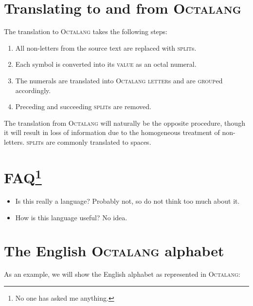 \documentclass{article}
\newcommand{\octalang}[0]{\textsc{Octalang}}
\newcommand{\tvalue}[0]{\textsc{value}}
\newcommand{\tletter}[0]{\textsc{letter}}
\newcommand{\tgroup}[0]{\textsc{group}}
\newcommand{\tsplit}[0]{\textsc{split}}
\begin{document}
\section*{Translating to and from {\sffamily\octalang{}}}

The translation to \octalang{} takes the following steps:

\begin{enumerate}
  \item All non-letters from the source text are replaced with \tsplit{}s.
  \item Each symbol is converted into its \tvalue{} as an octal numeral.
  \item The numerals are translated into \octalang{} \tletter{}s and are \tgroup{}ed accordingly.
  \item Preceding and succeeding \tsplit{}s are removed.
\end{enumerate} 

The translation from \octalang{} will naturally be the opposite procedure, though it will result in loss of information due to the homogeneous treatment of non-letters. \tsplit{}s are commonly translated to spaces.

\section*{FAQ\protect\footnote{No one has asked me anything.}}

\begin{itemize}
  \item Is this really a language? Probably not, so do not think too much about it.
  \item How is this language useful? No idea.
\end{itemize}

\newpage
{}

\section*{The English {\sffamily\octalang{}} alphabet}

As an example, we will show the English alphabet as represented in \octalang{}:
\end{document}
